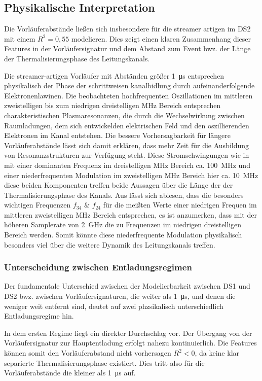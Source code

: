 \subsection{Physikalische Interpretation}
Die Vorläuferabstände ließen sich insbesondere für die streamer artigen im DS2 mit einem \(R^2 = 0,55\) modelieren. Dies zeigt einen klaren Zusammenhang dieser Features in der Vorläufersignatur und dem Abstand zum Event bwz. der Länge der Thermalisierungsphase des Leitungskanals.

Die streamer-artigen Vorläufer mit Abständen größer \SI{1}{\micro\second} entsprechen physikalisch der Phase der schrittweisen kanalbidlung durch aufeinanderfolgende Elektronenlawinen. Die beobachteten hochfrequenten Oszillationen im mittleren zweistelligen bis zum niedrigen dreistelligen MHz Bereich entsprechen charakteristischen Plasmaresonanzen, die durch die Wechselwirkung zwischen Raumladungen, dem sich entwickelden elektrischen Feld und den oszillierenden Elektronen im Kanal entstehen. Die bessere Vorhersagbarkeit für längere Vorläuferabstände lässt sich damit erklären, dass mehr Zeit für die Ausbildung von Resonanzstrukturen zur Verfügung steht. Diese Stromschwingungen wie in  mit einer dominanten Frequenz im dreistelligen MHz Bereich ca. \SI{100}{\mega\hertz} und einer niederfrequenten Modulation im zweistelligen MHz Bereich hier ca. \SI{10}{\mega\hertz} diese beiden Komponenten treffen beide Aussagen über die Länge der der Thermalisierungsphase des Kanals. Aus  lässt sich ablesen, dass die besonders wichtigen Frequenzen \(f_{34}\) & \(f_{24}\) für die meißten Werte einer niedrigen Frequen im mittleren zweistelligen MHz Bereich entsprechen, es ist anzumerken, dass mit der höheren Samplerate von \SI{2}{\giga\hertz} die zu Frequenzen im niedrigen dreistelligen Bereich werden. Somit könnte diese niederfrequente Modulation physikalisch besonders viel über die weitere Dynamik des Leitungskanals treffen. 

\subsubsection{Unterscheidung zwischen Entladungsregimen}
Der fundamentale Unterschied zwischen der Modelierbarkeit zwischen DS1 und DS2 bwz. zwischen Vorläufersignaturen, die weiter als \SI{1}{\micro\second}, und denen die weniger weit entfernt sind, deutet auf zwei phzsikalisch unterschiedlich Entladungsregime hin. 

In dem ersten Regime liegt ein direkter Durchschlag vor. Der Übergang von der Vorläufersignatur zur Hauptentladung erfolgt nahezu kontinuierlich. Die Features können somit den Vorläuferabstand nicht vorhersagen \(R^2 < 0\), da keine klar separierte Thermalisierungsphase existiert. Dies tritt also für die Vorläuferabstände die kleiner als \SI{1}{\micro\second} auf. 

